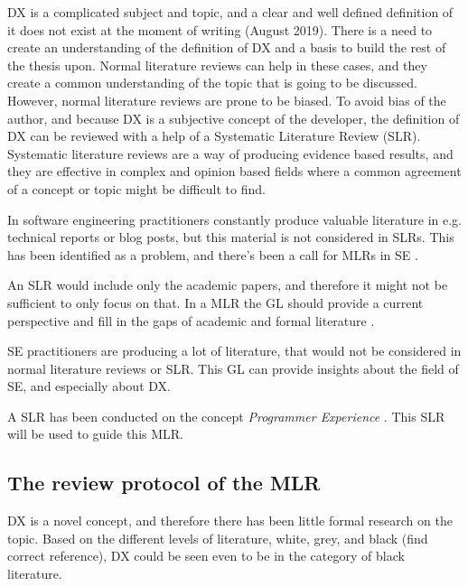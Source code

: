 \documentclass[english, 12pt, a4paper, sci, utf8, a-1b, online]{aaltothesis}
\begin{document}
DX is a complicated subject and topic, and a clear and well defined definition of it does not exist at the moment of writing (August 2019). There is a need to create an understanding of the definition of DX and a basis to build the rest of the thesis upon. Normal literature reviews can help in these cases, and they create a common understanding of the topic that is going to be discussed. However, normal literature reviews are prone to be biased. To avoid bias of the author, and because DX is a subjective concept of the developer, the definition of DX can be reviewed with a help of a Systematic Literature Review (SLR). Systematic literature reviews are a way of producing evidence based results, and they are effective in complex and opinion based fields where a common agreement of a concept or topic might be difficult to find.

In software engineering practitioners constantly produce valuable literature in e.g. technical reports or blog posts, but this material is not considered in SLRs. This has been identified as a problem, and there's been a call for MLRs in SE \cite{the-need-for-MLR}.

An SLR would include only the academic papers, and therefore it might not be sufficient to only focus on that. In a MLR the GL should provide a current perspective and fill in the gaps of academic and formal literature \cite{guidelines-for-MLR}.

SE practitioners are producing a lot of literature, that would not be considered in normal literature reviews or SLR. This GL can provide insights about the field of SE, and especially about DX.

A SLR has been conducted on the concept \textit{Programmer Experience} \cite{programmer-experience}. This SLR will be used to guide this MLR.


\subsection{The review protocol of the MLR}

DX is a novel concept, and therefore there has been little formal research on the topic. Based on the different levels of literature, white, grey, and black \cite{guidelines-for-MLR} (find correct reference), DX could be seen even to be in the category of black literature.

\newcommand{\mlrdxlink}{https://docs.google.com/spreadsheets/d/1BLX4eQypAvxd3Gzft0s0rqUHdMYaKxPAbpZZ4dAvJqU/edit?usp=sharing}
\end{document}
